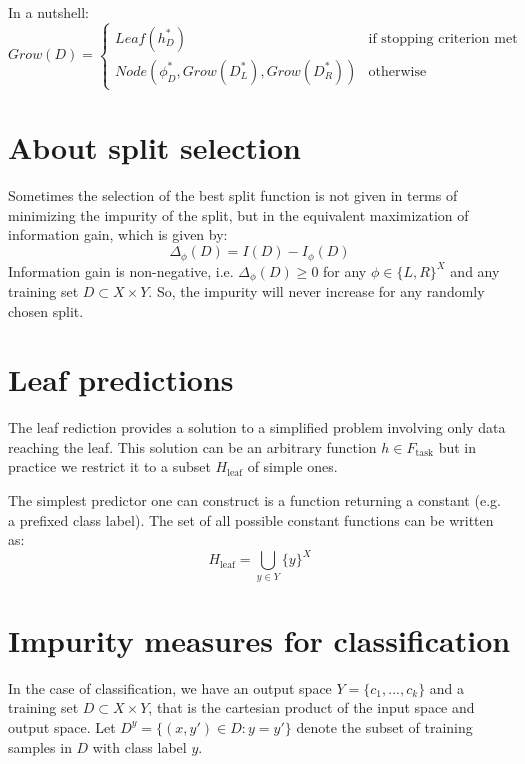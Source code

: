 In a nutshell:
\begin{equation}
    Grow(D)=\begin{cases}
        Leaf(h_D^*)                                  &\text{if stopping criterion met}\\
        Node(\phi_D^*, Grow(D_L^*), Grow(D_R^*))     &\text{otherwise}
    \end{cases}
\end{equation}

\section{About split selection}
Sometimes the selection of the best split function is not given in terms of minimizing the impurity of the split, but in the equivalent maximization of information gain, which is given by:
\begin{equation}
    \Delta_\phi(D)=I(D)-I_\phi(D)
\end{equation}
Information gain is non-negative, i.e. \(\Delta_\phi(D) \geq 0\) for any \(\phi \in \{L,R\}^X\) and any training set \(D \subset X \times Y\). So, the impurity will never increase for any randomly chosen split.

\section{Leaf predictions}
The leaf rediction provides a solution to a simplified problem involving only data reaching the leaf. This solution can be an arbitrary function \(h \in F_\text{task}\) but in practice we restrict it to a subset \(H_\text{leaf}\) of simple ones. 

The simplest predictor one can construct is a function returning a constant (e.g. a prefixed class label). The set of all possible constant functions can be written as:
\begin{equation}
    H_\text{leaf} = \bigcup_{y \in Y} \{y\}^X
\end{equation}

\section{Impurity measures for classification}
In the case of classification, we have an output space \(Y = \{c_1,...,c_k\}\) and a training set \(D \subset X \times Y\), that is the cartesian product of the input space and output space. Let \(D^y = \{(x,y') \in D : y = y'\}\) denote the subset of training samples in \(D\) with class label \(y\). 

